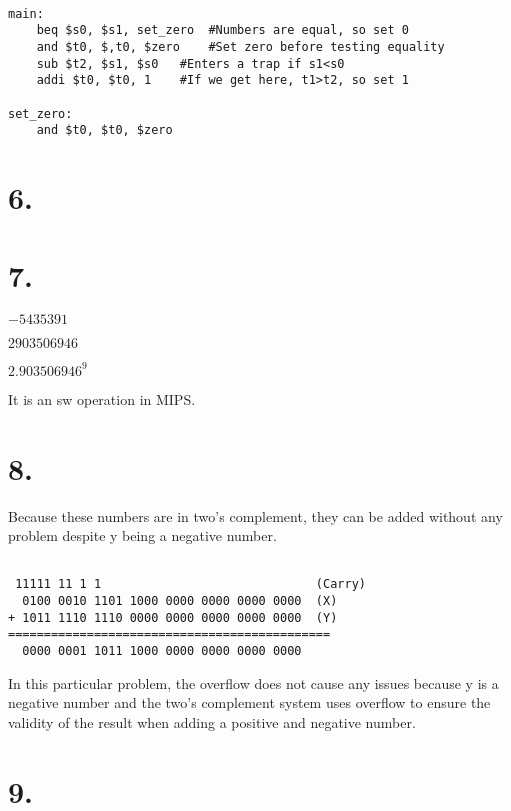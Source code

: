 \documentclass[12pt]{article}
\begin{document}
\begin{lstlisting}

main:
	beq $s0, $s1, set_zero	#Numbers are equal, so set 0
	and $t0, $,t0, $zero    #Set zero before testing equality
	sub $t2, $s1, $s0	#Enters a trap if s1<s0
	addi $t0, $t0, 1 	#If we get here, t1>t2, so set 1

set_zero:
	and $t0, $t0, $zero

\end{lstlisting}



\section*{6.}

\section*{7.}

 $-5435391$

 $2903506946$

 $2.903506946^9$

 It is an sw operation in MIPS.

\section*{8.}

Because these numbers are in two's complement, they can be added without any problem despite y being a negative number.

\begin{verbatim}

 11111 11 1 1                              (Carry)
  0100 0010 1101 1000 0000 0000 0000 0000  (X)
+ 1011 1110 1110 0000 0000 0000 0000 0000  (Y)
=============================================
  0000 0001 1011 1000 0000 0000 0000 0000
\end{verbatim}

In this particular problem, the overflow does not cause any issues because y is a negative number and the two's complement system uses overflow to ensure the validity of the result when adding a positive and negative number.

\section*{9.}
\end{document}
